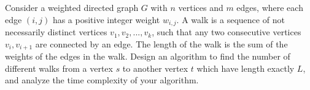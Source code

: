 \problem{}
Consider a weighted directed graph $G$ with $n$ vertices and $m$ edges, where each edge $(i,j)$ has a positive integer weight $w_{i, j}$. A  walk is a sequence of not necessarily distinct vertices $v_1, v_2, ..., v_k$, such that any two consecutive vertices $v_i, v_{i+1}$ are connected by an edge. The length of the walk is the sum of the weights of the edges in the walk.  Design an algorithm to find the number of different walks from a vertex $s$ to another vertex $t$ which have length exactly $L$, and analyze the time complexity of your algorithm. 

\solution{}

\newpage
